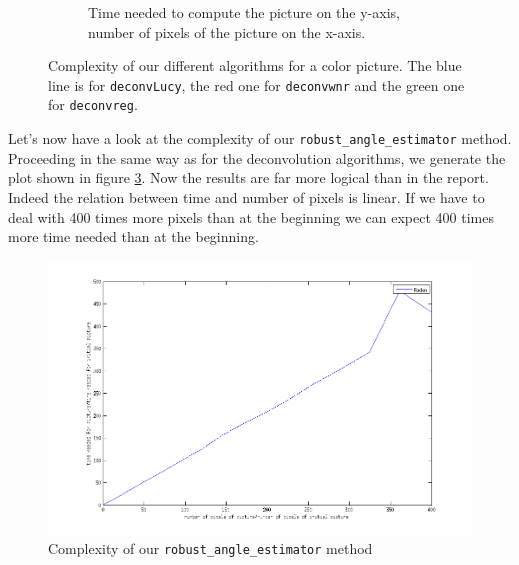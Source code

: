 \documentclass{article}
\begin{document}
\begin{figure}[h!]
\begin{subfigure}{0.4\textwidth}
\caption{Time  needed to compute the picture on the y-axis, number of pixels of the picture on the x-axis.}
\label{fig:ComplexityAbs}
\end{subfigure}
\caption{Complexity of our different algorithms for a color picture. The blue line is for \texttt{deconvLucy}, the red one for \texttt{deconvwnr} and the green one for \texttt{deconvreg}.}
\label{fig:Complexity}
\end{figure}



Let's now have a look at the complexity of our \texttt{robust\_angle\_estimator} method. Proceeding in the same way as for the deconvolution algorithms, we generate the plot shown in figure \ref{fig:ComplexityRadon}. Now the results are far more logical than in the report. Indeed the relation between time and number of pixels is linear. If we have to deal with 400 times more pixels than at the beginning we can expect 400 times more time needed than at the beginning. 


\begin{figure}[h!]
\centering
\includegraphics[scale=0.4]{../Images/ComplexityRadon.png}
\caption{Complexity of our \texttt{robust\_angle\_estimator} method}
\label{fig:ComplexityRadon}
\end{figure}
\end{document}
